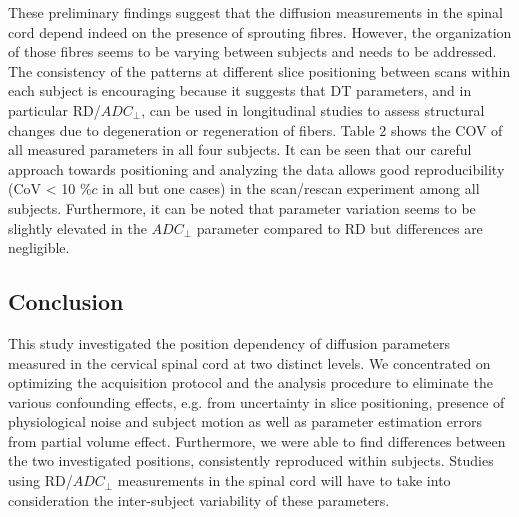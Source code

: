These preliminary findings suggest that the diffusion measurements in the spinal cord depend indeed on the presence of sprouting fibres. However, the organization of those fibres seems to be varying between subjects and needs to be addressed. The consistency of the patterns at different slice positioning between scans within each subject is encouraging because it suggests that DT parameters, and in particular RD/$ADC_\perp$, can be used in longitudinal studies to assess structural changes due to degeneration or regeneration of fibers. Table 2 shows the COV of all measured parameters in all four subjects. It can be seen that our careful approach towards positioning and analyzing the data allows good reproducibility (CoV < 10 $\%c$ in all but one cases) in the scan/rescan experiment among all subjects. Furthermore, it can be noted that parameter variation seems to be slightly elevated in the $ADC_\perp$ parameter compared to RD but differences are negligible.

\subsection*{Conclusion} This study investigated the position dependency of diffusion parameters measured in the cervical spinal cord at two distinct levels. We concentrated on optimizing the acquisition protocol and the analysis procedure to eliminate the various confounding effects, e.g. from uncertainty in slice positioning, presence of physiological noise and subject motion as well as parameter estimation errors from partial volume effect. Furthermore, we were able to find differences between the two investigated positions, consistently reproduced within subjects. Studies using RD/$ADC_\perp$ measurements in the spinal cord will have to take into consideration the inter-subject variability of these parameters.

